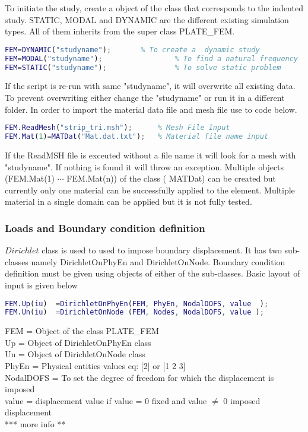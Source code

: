 \documentclass[main.tex]{subfiles}
\begin{document}
To initiate the study, create a object of the class that corresponds to the indented study. STATIC, MODAL and DYNAMIC are the different existing simulation types. All of them inherits from the super class PLATE\_FEM. 
\begin{lstlisting}[language=matlab]
FEM=DYNAMIC("studyname");	    % To create a  dynamic study
FEM=MODAL("studyname");	                % To find a natural frequency
FEM=STATIC("studyname");	            % To solve static problem
\end{lstlisting}
If the script is re-run with same "studyname", it will overwrite all existing data. To prevent overwriting either change the "studyname" or run it in a different folder. In order to import the material data file and mesh file use to code below.
\begin{lstlisting}[language=matlab]
FEM.ReadMesh("strip_tri.msh");      % Mesh File Input
FEM.Mat(1)=MATDat("Mat.dat.txt");   % Material file name input
\end{lstlisting}
If the ReadMSH file is exceuted without a file name it will look for a mesh with "studyname". If nothing is found it will throw an exception.
Multiple objects (FEM.Mat(1) $\cdots$ FEM.Mat(n)) of the class ( MATDat) can be created but currently only one material can be successfully applied to the element. Multiple material in a single domain can be applied but it is not fully tested. 

\subsubsection{Loads and Boundary condition definition}

$Dirichlet$ class is used to used to impose boundary displacement. It has two sub-classes namely DirichletOnPhyEn and DirichletOnNode. Boundary condition definition must be given using objects of either of the sub-classes. Basic layout of input is given below
\begin{lstlisting}[language=matlab]
FEM.Up(iu)  =DirichletOnPhyEn(FEM, PhyEn, NodalDOFS, value  );
FEM.Un(iu)  =DirichletOnNode (FEM, Nodes, NodalDOFS, value );
\end{lstlisting}
   
FEM = Object of the class PLATE\_FEM \\
Up  = Object of DirichletOnPhyEn class \\
Un  = Object of DirichletOnNode class \\
PhyEn = Physical entities values eq: [2] or [1 2 3] \\
NodalDOFS = To set the degree of freedom for which the displacement is imposed \\
value  = displacement value if value = 0 fixed and value $\neq$ 0 imposed displacement \\
*** more info **
\end{document}

